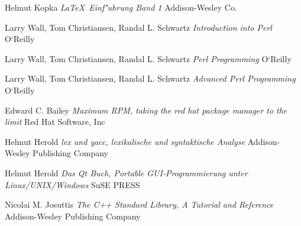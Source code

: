  Helmut Kopka
 \textsl{ \LaTeX\ Einf"uhrung Band 1 }
 Addison-Wesley Co.

 Larry Wall, Tom Christiansen, Randal L. Schwartz
 \textsl{ Introduction into Perl }
 O`Reilly

 Larry Wall, Tom Christiansen, Randal L. Schwartz
 \textsl{ Perl Programming }
 O`Reilly

 Larry Wall, Tom Christiansen, Randal L. Schwartz
 \textsl{ Advanced Perl Programming }
 O`Reilly

 Edward C. Bailey
 \textsl{ Maximum RPM, taking the red hat package manager to the limit }
 Red Hat Software, Inc

 Helmut Herold
 \textsl{ lex und yacc, lexikalische und syntaktische Analyse }
 Addison-Wesley Publishing Company

 Helmut Herold
 \textsl{ Das Qt Buch, Portable GUI-Programmierung unter Linux/UNIX/Windows }
 SuSE PRESS

 Nicolai M. Josuttis
 \textsl{ The C++ Standard Library, A Tutorial and Reference }
 Addison-Wesley Publishing Company
